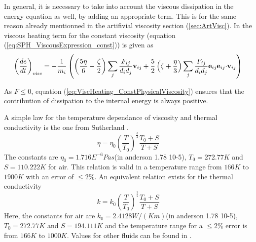 \documentclass{report}
\begin{document}
In general, it is necessary to take into account the viscous dissipation in the energy equation as well, by adding an appropriate term. This is for the same reason already mentionned in the artifivial viscosity section (\ref{sec:ArtVisc}). In \cite{Espanol2003} the viscous heating term for the constant viscosity (equation (\ref{eq:SPH_ViscousExpression_const})) is given as 
\begin{equation}
\label{eq:ViscHeating_ConstPhysicalViscosity}
 \left(\frac{de}{dt}\right)_{\mathit{visc}}=-\frac{1}{m_i}\left(\left(\frac{5\eta}{6}-\frac{\zeta}{2}\right)\sum_j\frac{F_{ij}}{d_i d_j}{\bf v}_{ij}+\frac{5}{2} \left(\zeta+\frac{\eta}{3}\right) \sum_j\frac{F_{ij}}{d_i d_j}{\bf e}_{ij} {\bf e}_{ij}{\bf \cdot v}_{ij}\right)
\end{equation}

As $ F\leq 0$, equation (\ref{eq:ViscHeating_ConstPhysicalViscosity}) ensures that the contribution of dissipation to the internal energy is always positive.

A simple law for the temperature dependance of viscosity and thermal conductivity is the one from Sutherland \cite{White1974}.
\begin{equation}
\eta=\eta_0 \left(\frac{T}{T_0}\right)^{\frac{3}{2}}\frac{T_0+S}{T+S}
\end{equation}
The constants are $\eta_0=1.716E^{-6}Pa s$(in anderson 1.78 10-5), $T_0=272.77K$ and $S=110.222K$ for air. This relation is valid in a temperature range from $166K$ to $1900K$ with an error of $\leq2\%$.
An equivalent relation exists for the thermal conductivity 
\begin{equation}
k=k_0 \left(\frac{T}{T_0}\right)^{\frac{3}{2}}\frac{T_0+S}{T+S}
\end{equation}
Here, the constants for air are $k_0=2.4128W/(K m)$(in anderson 1.78 10-5), $T_0=272.77K$ and $S=194.111K$ and the temperature range for a  $\leq2\%$ error is from $166K$ to $1000K$. Values for other fluids can be found in \cite{White1974}.
\end{document}
